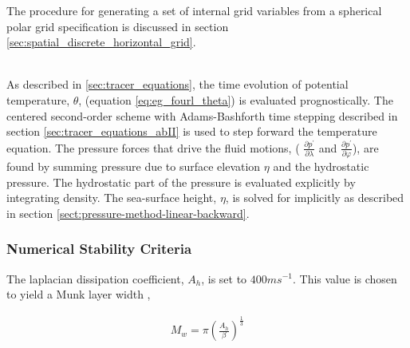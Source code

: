 The procedure for generating a set of internal grid variables from a
spherical polar grid specification is discussed in section 
\ref{sec:spatial_discrete_horizontal_grid}.

\noindent{}\\



As described in \ref{sec:tracer_equations}, the time evolution of potential 
temperature, 
$\theta$, (equation \ref{eq:eg_fourl_theta})
is evaluated prognostically. The centered second-order scheme with
Adams-Bashforth time stepping described in section 
\ref{sec:tracer_equations_abII} is used to step forward the temperature 
equation. The pressure forces that drive the fluid motions, (
$\frac{\partial p^{'}}{\partial \lambda}$ and $\frac{\partial p^{'}}{\partial \varphi}$), are found by summing pressure due to surface 
elevation $\eta$ and the hydrostatic pressure. The hydrostatic part of the 
pressure is evaluated explicitly by integrating density. The sea-surface
height, $\eta$, is solved for implicitly as described in section 
\ref{sect:pressure-method-linear-backward}.

\subsubsection{Numerical Stability Criteria}

The laplacian dissipation coefficient, $A_{h}$, is set to $400 m s^{-1}$.
This value is chosen to yield a Munk layer width \cite{Adcroft_thesis},

\begin{eqnarray}
\label{EQ:munk_layer}
M_{w} = \pi ( \frac { A_{h} }{ \beta } )^{\frac{1}{3}}
\end{eqnarray}

